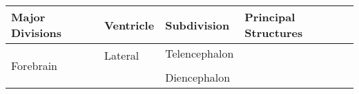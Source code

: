 \begin{table}[ht]
      \centering
      \begin{tabular}{l l l l}
            \toprule
            \textbf{Major Divisions} & \textbf{Ventricle}                                       & \textbf{Subdivision}          & \textbf{Principal Structures} \\
            \midrule

            \multirow{7}{*}{Forebrain}
                                     & \multirow{5}{*}{Lateral}
                                     & \multirow{4}{*}{Telencephalon}
                                     & \underline{\phantom{Cerebral Cortex}}                                                                                    \\
                                     &                                                          &
                                     & \underline{\phantom{Corpus Callosum}}                                                                                    \\
                                     &                                                          &
                                     & \underline{\phantom{Basal Ganglia}}                                                                                      \\
                                     &                                                          &
                                     & \underline{\phantom{Limbic System}}                                                                                      \\[0.5em]
            \cline{3-4}                                                                                                                                         \\[-0.5em]
                                     & \multirow{2}{*}{\underline{\phantom{Third}}}             & \multirow{2}{*}{Diencephalon}
                                     & \underline{\phantom{Thalamus}}                                                                                           \\
                                     &                                                          &
                                     & \underline{\phantom{Hypothalamus}}                                                                                       \\
            \midrule


\end{tabular}
\end{table}
